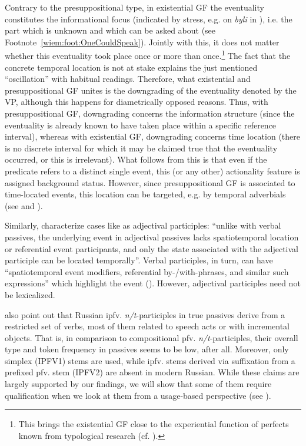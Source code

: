 \documentclass[output=paper]{langscibook}
\begin{document}
\noindent Contrary to the presuppositional type, in existential GF the eventuality constitutes the informational focus (indicated by stress, e.g. on \textit{byli} in ), i.e. the part which is unknown and which can be asked about (see Footnote~\ref{wiem:foot:OneCouldSpeak}). Jointly with this, it does not matter whether this eventuality took place once or more than once.\footnote{This brings the existential GF close to the experiential function of perfects known from typological research (cf. \citealt{Arkadiev.Wiemer2020}).} The fact that the concrete temporal location is not at stake explains the just mentioned “oscillation” with habitual readings. Therefore, what existential and presuppositional GF unites is the downgrading of the eventuality denoted by the VP, although this happens for diametrically opposed reasons. Thus, with presuppositional GF, downgrading concerns the information structure (since the eventuality is already known to have taken place within a specific reference interval), whereas with existential GF, downgrading concerns time location (there is no discrete interval for which it may be claimed true that the eventuality occurred, or this is irrelevant). What follows from this is that even if the predicate refers to a distinct single event, this (or any other) actionality feature is assigned background status. However, since presuppositional GF is associated to time-located events, this location can be targeted, e.g. by temporal adverbials (see  and ).

Similarly, \citet[][59]{Borik.Gehrke2018} characterize cases like  as adjectival participles: “unlike with verbal passives, the underlying event in adjectival passives lacks spatiotemporal location or referential event participants, and only the state associated with the adjectival participle can be located temporally”. Verbal participles, in turn, can have “spatiotemporal event modifiers, referential \mbox{by-}\slash\mbox{with-}phrases, and similar such expressions” which highlight the event (\citealt[59]{Borik.Gehrke2018}). However, adjectival participles need not be lexicalized.\largerpage[1]

\citeauthor{Borik.Gehrke2018} also point out that Russian ipfv. \textit{n/t}-participles in true passives derive from a restricted set of verbs, most of them related to speech acts or with incremental objects. That is, in comparison to compositional pfv. \textit{n/t}-participles, their overall type and token frequency in passives seems to be low, after all. Moreover, only simplex (IPFV1) stems are used, while ipfv. stems derived via suffixation from a prefixed pfv. stem (IPFV2) are absent in modern Russian. While these claims are largely supported by our findings, we will show that some of them require qualification when we look at them from a usage-based perspective (see ).
\end{document}
